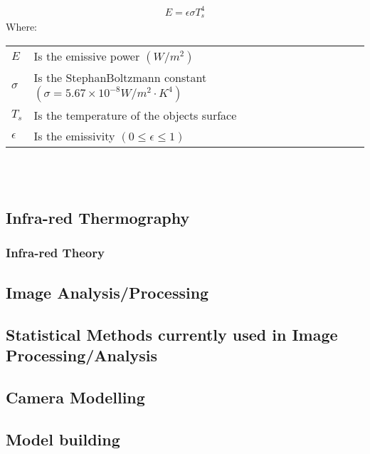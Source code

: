 \documentclass[12pt]{article}
\newcommand{\pe}{\vspace{0.3cm}}
\begin{document}
\begin{align} \label{StephBoltzSimp}
E = \epsilon \sigma T_s^4
\end{align} 
Where: \\ 
\begin{tabular}{l | l}
	$E$ & Is the emissive power $(W/m^2)$ \\ 
	$\sigma$ & Is the StephanBoltzmann constant $(\sigma = 5.67 \times 10^{-8} W/m^2 \cdot K^4)$ \\ 
	$T_s$ & Is the temperature of the objects surface \\   
	$\epsilon$ & Is the emissivity $(0 \leq \epsilon \leq 1)$ 
\end{tabular}
\\ \pe \\ 


\subsection{Infra-red Thermography}

\subsubsection{Infra-red Theory}

\subsection{Image Analysis/Processing}

\subsection{Statistical Methods currently used in Image Processing/Analysis} 


\subsection{Camera Modelling}

\subsection{Model building}
\end{document}
